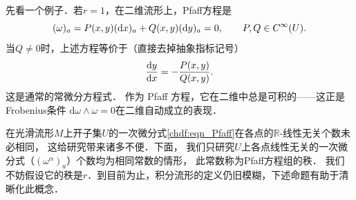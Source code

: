 先看一个例子．若$r=1$，在二维流形上，Pfaff方程是
\begin{equation}
    (\omega)_a = P(x,y)({\rm d}x)_a +Q(x,y)({\rm d}y)_a =0, \qquad P,Q\in C^\infty(U).
\end{equation}
当$Q\neq 0$时，上述方程等价于（直接去掉抽象指标记号）
\begin{equation}
    \frac{{\rm d}y}{{\rm d}x}=-\frac{P(x,y)}{Q(x,y)}.
\end{equation}
这是通常的常微分方程式．
作为 Pfaff 方程，它在二维中总是可积的——这正是Frobenius条件 
$\mathrm{d}\omega\wedge \omega = 0$在二维自动成立的表现．


在光滑流形$M$上开子集$U$的一次微分式\eqref{chdf:eqn_Pfaff}在各点的$\mathbb{R}$-线性无关个数未必相同，
这给研究带来诸多不便．下面，
我们只研究$U$上各点线性无关的一次微分式（$(\omega^\alpha)_a$）个数均为相同常数的情形，
此常数称为Pfaff方程组的{\heiti 秩}．
我们不妨假设它的秩是$r$．到目前为止，积分流形的定义仍旧模糊，下述命题有助于清晰化此概念．

